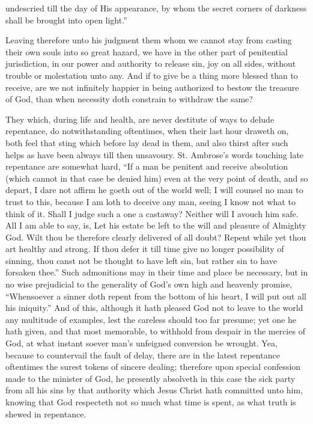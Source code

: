 undescried till the day of His appearance, by whom the secret corners of darkness shall be brought into open light.”

Leaving therefore unto his judgment them whom we cannot stay from casting their own souls into so great hazard, we have in the other part of penitential jurisdiction, in our power and authority to release sin, joy on all sides, without trouble or molestation unto any. And if to give be a thing more blessed than to receive, are we not infinitely happier in being authorized to bestow the treasure of God, than when necessity doth constrain to withdraw the same?

They which, during life and health, are never destitute of ways to delude repentance, do notwithstanding oftentimes, when their last hour draweth on, both feel that sting which before lay dead in them, and also thirst after such helps as  have been always till then unsavoury. St. Ambrose’s words touching late repentance are somewhat hard, “If a man be penitent and receive absolution (which cannot in that case be denied him) even at the very point of death, and so depart, I dare not affirm he goeth out of the world well; I will counsel no man to trust to this, because I am loth to deceive any man, seeing I know not what to think of it. Shall I judge such a one a castaway? Neither will I avouch him safe. All I am able to say, is, Let his estate be left to the will and pleasure of Almighty God. Wilt thou be therefore clearly delivered of all doubt? Repent while yet thou art healthy and strong. If thou defer it till time give no longer possibility of sinning, thou canst not be thought to have left sin, but rather sin to have forsaken thee.” Such admonitions may in their time and place be necessary, but in no wise prejudicial to the generality of God’s own high and heavenly promise, “Whensoever a sinner doth repent from the bottom of his heart, I will put out all his iniquity.” And of this, although it hath pleased God not to leave to the world any multitude of examples, lest the careless should too far presume; yet one he hath given, and that most memorable, to withhold from despair in the mercies of God, at what instant soever man’s unfeigned conversion be wrought. Yea, because to countervail the fault of delay, there are in the latest repentance oftentimes the surest tokens of sincere dealing; therefore upon special confession made to the minister of God, he presently absolveth in this case the sick party from all his sins by that authority which Jesus Christ hath committed unto him, knowing that God respecteth  not so much what time is spent, as what truth is shewed in repentance.

